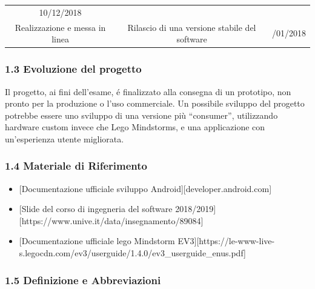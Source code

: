 \documentclass[]{article}
\providecommand{\tightlist}{%
  \setlength{\itemsep}{0pt}\setlength{\parskip}{0pt}}
\begin{document}
\begin{longtable}[]{@{}ccc@{}}
\begin{minipage}[t]{0.13\columnwidth}
10/12/2018\strut
\end{minipage}\tabularnewline
\begin{minipage}[t]{0.31\columnwidth}\centering
Realizzazione e messa in linea\strut
\end{minipage} & \begin{minipage}[t]{0.47\columnwidth}\centering
Rilascio di una versione stabile del software\strut
\end{minipage} & \begin{minipage}[t]{0.13\columnwidth}\centering
31/01/2018\strut
\end{minipage}\tabularnewline
\bottomrule
\end{longtable}

\hypertarget{evoluzione-del-progetto}{%
\subsubsection{1.3 Evoluzione del
progetto}\label{evoluzione-del-progetto}}

Il progetto, ai fini dell'esame, é finalizzato alla consegna di un
prototipo, non pronto per la produzione o l'uso commerciale. Un
possibile sviluppo del progetto potrebbe essere uno sviluppo di una
versione più ``consumer'', utilizzando hardware custom invece che Lego
Mindstorms, e una applicazione con un'esperienza utente migliorata.

\hypertarget{materiale-di-riferimento}{%
\subsubsection{1.4 Materiale di
Riferimento}\label{materiale-di-riferimento}}

\begin{itemize}
\tightlist
\item
  {[}Documentazione ufficiale sviluppo
  Android{]}{[}developer.android.com{]}
\item
  {[}Slide del corso di ingegneria del software
  2018/2019{]}{[}https://www.unive.it/data/insegnamento/89084{]}
\item
  {[}Documentazione ufficiale lego Mindstorm
  EV3{]}{[}https://le-www-live-s.legocdn.com/ev3/userguide/1.4.0/ev3\_userguide\_enus.pdf{]}
\end{itemize}

\hypertarget{definizione-e-abbreviazioni}{%
\subsubsection{1.5 Definizione e
Abbreviazioni}\label{definizione-e-abbreviazioni}}
\end{document}
